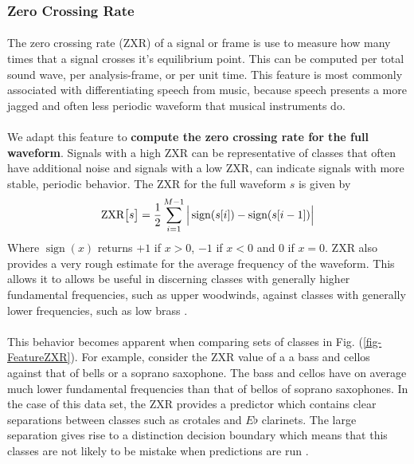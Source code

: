 \documentclass[12pt,letterpaper]{article}
\DeclareMathOperator{\sign}{\text{sign}}
\begin{document}

\subsubsection{Zero Crossing Rate}

\paragraph*{}The zero crossing rate (ZXR) of a signal or frame is use to measure how many times that a signal crosses it's equilibrium point. This can be computed per total sound wave, per analysis-frame, or per unit time. This feature is most commonly associated with differentiating speech from music, because speech presents a more jagged and often less periodic waveform \cite{Kahn,Liu,Zhang} that musical instruments do. 

\paragraph*{}We adapt this feature to \textbf{compute the zero crossing rate for the full waveform}. Signals with a high ZXR can be representative of classes that often have additional noise and signals with a low ZXR, can indicate signals with more stable, periodic behavior. The ZXR for the full waveform $s$ is given by \cite{Serizel,Liu}
\begin{equation}
\label{eqn-ZXR}
\text{ZXR}\big[ s \big] = \frac{1}{2} \sum_{i=1}^{M-1} \Big{|} \sign(s[i]) - \sign(s[i-1]) \Big{|} 
\end{equation}
Where $\sign(x)$ returns $+1$ if $x > 0$, $-1$ if $x < 0$ and $0$ if $x = 0$. ZXR also provides a very rough estimate for the average frequency of the waveform. This allows it to allows be useful in discerning classes with generally higher fundamental frequencies, such as upper woodwinds, against classes with generally lower frequencies, such as low brass \cite{Liu,White}.

\paragraph*{}This behavior becomes apparent when comparing sets of classes in Fig. (\ref{fig-FeatureZXR}). For example, consider the ZXR value of a a bass and cellos against that of bells or a soprano saxophone. The bass and cellos have on average much lower fundamental frequencies than that of bellos of soprano saxophones. In the case of this data set, the ZXR provides a predictor which contains clear separations between classes such as crotales and $E\flat$ clarinets. The large separation gives rise to a distinction decision boundary which means that this classes are not likely to be mistake when predictions are run \cite{Loy,James}.
\end{document}
